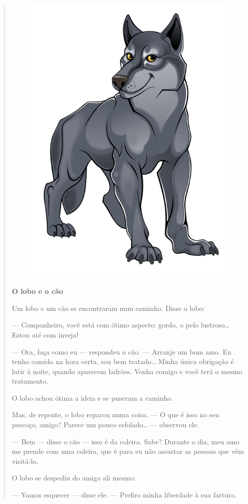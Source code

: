\begin{conteudo}
\begin{conteudo}
\begin{conteudo}
\begin{conteudo}
\begin{quote}
\begin{figure}
\includegraphics[width=.5\textwidth]{media/image22.png}
\end{figure}

\textbf{O lobo e o cão}

Um lobo e um cão se encontraram num caminho. Disse o lobo:

--- Companheiro, você está com ótimo aspecto: gordo, o pelo
lustroso\ldots{} Estou até com inveja!

--- Ora, faça como eu --- respondeu o cão. --- Arranje um bom amo. Eu
tenho comida na hora certa, sou bem tratado\ldots{} Minha única
obrigação é latir à noite, quando aparecem ladrões. Venha comigo e você
terá o mesmo tratamento.

O lobo achou ótima a ideia e se puseram a caminho.

Mas, de repente, o lobo reparou numa coisa. --- O que é isso no seu
pescoço, amigo? Parece um pouco esfolado\ldots{} --- observou ele.

--- Bem --- disse o cão --- isso é da coleira. Sabe? Durante o dia,
meu amo me prende com uma coleira, que é para eu não assustar as pessoas
que vêm visitá-lo.

O lobo se despediu do amigo ali mesmo:

--- Vamos esquecer --- disse ele. --- Prefiro minha liberdade à sua
fartura.

\end{quote}


\end{conteudo}
\end{conteudo}
\end{conteudo}
\end{conteudo}
